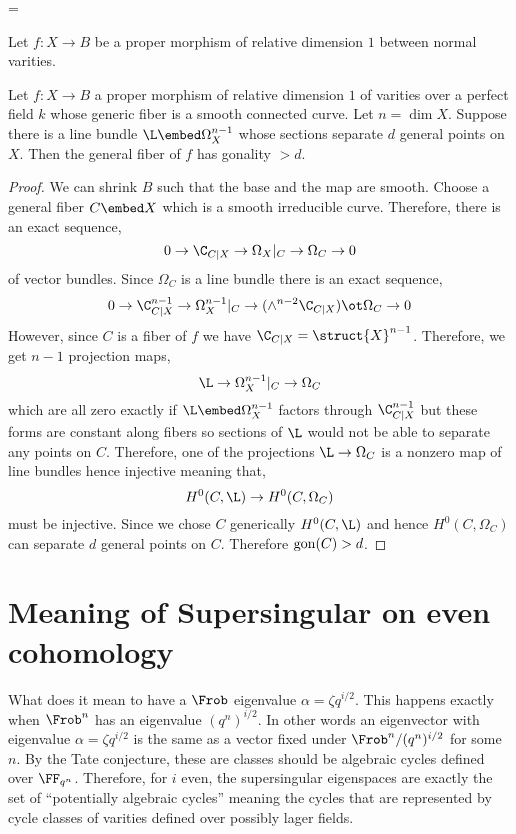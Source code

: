 =\documentclass[12pt]{article}
\begin{document}
\begin{lemma}
Let $f : X \to B$ be a proper morphism of relative dimension $1$ between normal varities.
\end{lemma}

\begin{lemma}
Let $f : X \to B$ a proper morphism of relative dimension $1$ of varities over a perfect field $k$ whose generic fiber is a smooth connected curve. Let $n = \dim{X}$. Suppose there is a line bundle $\L \embed \Omega_X^{n-1}$ whose sections separate $d$ general points on $X$. Then the general fiber of $f$ has gonality $> d$.
\end{lemma}

\begin{proof}
We can shrink $B$ such that the base and the map are smooth. Choose a general fiber $C \embed X$ which is a smooth irreducible curve. Therefore, there is an exact sequence,
\[ 0 \to \C_{C|X} \to \Omega_{X}|_C \to \Omega_C \to 0 \]
of vector bundles. Since $\Omega_C$ is a line bundle there is an exact sequence,
\[ 0 \to \C_{C|X}^{n-1} \to \Omega^{n-1}_X|_C \to (\wedge^{n-2} \C_{C|X}) \ot \Omega_C \to 0 \]
However, since $C$ is a fiber of $f$ we have $\C_{C|X} = \struct{X}^{n-1}$. Therefore, we get $n-1$ projection maps,
\[ \L \to \Omega_X^{n-1}|_C \to \Omega_C \]
which are all zero exactly if $\L \embed \Omega_X^{n-1}$ factors through $\C_{C|X}^{n-1}$ but these forms are constant along fibers so sections of $\L$ would not be able to separate any points on $C$. Therefore, one of the projections $\L \to \Omega_C$ is a nonzero map of line bundles hence injective meaning that,
\[ H^0(C, \L) \to H^0(C, \Omega_C) \]
must be injective. Since we chose $C$ generically $H^0(C, \L)$ and hence $H^0(C, \Omega_C)$ can separate $d$ general points on $C$. Therefore $\mathrm{gon}(C) > d$. 
\end{proof}

\newpage 

\section{Meaning of Supersingular  on even cohomology}

What does it mean to have a $\Frob$ eigenvalue $\alpha = \zeta q^{i/2}$. This happens exactly when $\Frob^n$ has an eigenvalue $(q^n)^{i/2}$. In other words an eigenvector with eigenvalue $\alpha = \zeta q^{i/2}$ is the same as a vector fixed under $\Frob^n / (q^n)^{i/2}$ for some $n$. By the Tate conjecture, these are classes should be algebraic cycles defined over $\FF_{q^n}$. Therefore, for $i$ even, the supersingular eigenspaces are exactly the set of ``potentially algebraic cycles'' meaning the cycles that are represented by cycle classes of varities defined over possibly lager fields. 
\end{document}
